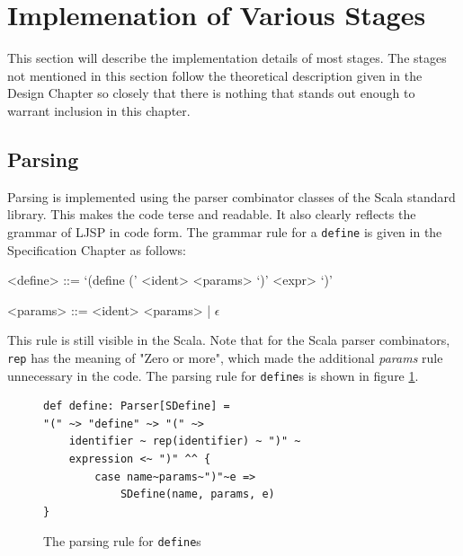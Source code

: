 \documentclass[11pt]{report}
\begin{document}
\section{Implemenation of Various Stages}
This section will describe the implementation details of most stages. The stages not mentioned in this section follow the theoretical description given in the Design Chapter so closely that there is nothing that stands out enough to warrant inclusion in this chapter.
\subsection{Parsing}
Parsing is implemented using the parser combinator classes of the Scala standard library. This makes the code terse and readable. It also clearly reflects the grammar of LJSP in code form. The grammar rule for a \texttt{define} is given in the Specification Chapter as follows:

\begin{grammar}
<define> ::= `(define (' <ident> <params> `)' <expr> `)'

<params> ::= <ident> <params> | $\epsilon$
\end{grammar}

This rule is still visible in the Scala. Note that for the Scala parser combinators, \texttt{rep} has the meaning of "Zero or more", which made the additional \textit{params} rule unnecessary in the code. The parsing rule for \texttt{define}s is shown in figure \ref{parsingrule}.

\begin{figure}[ht]
\begin{lstlisting}
def define: Parser[SDefine] = 
"(" ~> "define" ~> "(" ~> 
    identifier ~ rep(identifier) ~ ")" ~ 
    expression <~ ")" ^^ {
        case name~params~")"~e => 
            SDefine(name, params, e)
}
\end{lstlisting}
\caption{The parsing rule for \texttt{define}s}
\label{parsingrule}
\end{figure}


\end{document}
